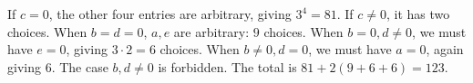 If $c=0$, the other four entries are arbitrary, giving $3^4=81$. If $c\ne0$, it has two choices. When $b=d=0$, $a,e$ are arbitrary: $9$ choices. When $b=0,d\ne0$, we must have $e=0$, giving $3\cdot2=6$ choices. When $b\ne0,d=0$, we must have $a=0$, again giving $6$. The case $b,d\ne0$ is forbidden. The total is $81+2(9+6+6)=\boxed{123}$.
